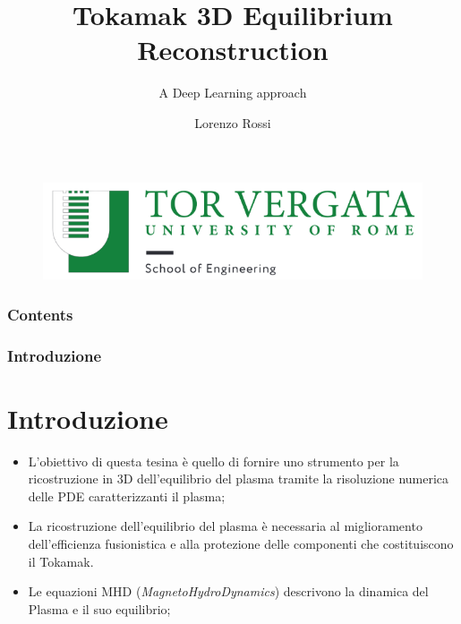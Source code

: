 \documentclass{beamer}
\title{Tokamak 3D Equilibrium Reconstruction}
\subtitle{A Deep Learning approach}
\author{Lorenzo Rossi}
\institute{Università di Roma "Tor Vergata"} %
\begin{document}
\begin{frame}
	\titlepage{}
	\vspace{-1cm}
	\begin{figure}
		\centering
		\includegraphics[scale=0.3]{2022-06-06-23-17-53.png}%
	\end{figure}
\end{frame}
\begin{frame}
	\frametitle{Contents}
	\tableofcontents
\end{frame}
\begin{frame}
	\frametitle{Introduzione}
	\section{Introduzione}
	\begin{itemize}
		\item L'obiettivo di questa tesina è quello di fornire uno strumento per la ricostruzione in 3D dell'equilibrio del plasma tramite la risoluzione numerica delle PDE caratterizzanti il plasma;
		\item La ricostruzione dell'equilibrio del plasma è necessaria al miglioramento dell'efficienza fusionistica e alla protezione delle componenti che costituiscono il Tokamak.
		\item Le equazioni MHD (\emph{MagnetoHydroDynamics}) descrivono la dinamica del Plasma e il suo equilibrio;

	\end{itemize}
\end{frame}
\end{document}
